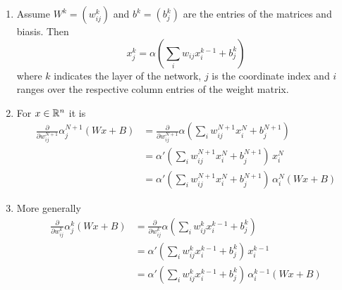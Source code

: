 \begin{remarks}
    \hfill
    \begin{enumerate}
        \item Assume \( W^k = (w^k_{ij}) \) and \( b^k = (b^k_j) \) are the entries of the matrices and biasis.
              Then
              \[
                  x^k_{j} = \alpha (\sum_{i} w_{ij} x^{k - 1}_i + b^k_j)
              \]
              where \( k \) indicates the layer of the network, \( j \) is the coordinate index and
              \( i \) ranges over the respective column entries of the weight matrix.
        \item For \( x \in \mathbb{R}^n \) it is
              \[
                  \begin{split}
                      \frac{\partial}{\partial w_{ij}^{N + 1}}\alpha_j^{N + 1}(Wx + B)
                      & = \frac{\partial}{\partial w_{ij}^{N + 1}} \alpha(\sum_{i} w_{ij}^{N + 1} x^{N}_i + b^{N + 1}_j) \\
                      & = \alpha'(\sum_{i} w_{ij}^{N + 1} x^{N}_i + b^{N + 1}_j)\, x_i^N \\
                      & = \alpha'(\sum_{i} w_{ij}^{N + 1} x^{N}_i + b^{N + 1}_j)\, \alpha_i^N(Wx + B)
                  \end{split}
              \]
        \item More generally
              \[
                  \begin{split}
                      \frac{\partial}{\partial w_{ij}^k}\alpha_j^k(Wx + B)
                      & = \frac{\partial}{\partial w_{ij}^k} \alpha(\sum_{i} w_{ij}^k x^{k - 1}_i + b_j^k) \\
                      & = \alpha'(\sum_{i} w_{ij}^k x^{k - 1}_i + b_j^k)\, x_i^{k - 1} \\
                      & = \alpha'(\sum_{i} w_{ij}^k x^{k - 1}_i + b_j^k)\, \alpha_i^{k - 1}(Wx + B)
                  \end{split}
              \]
    \end{enumerate}
\end{remarks}
\bigskip
